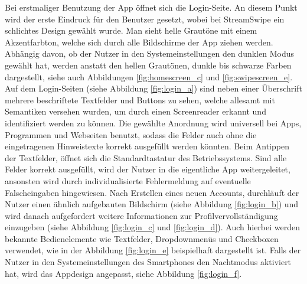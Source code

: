 Bei erstmaliger Benutzung der App öffnet sich die Login-Seite. An diesem Punkt wird der erste Eindruck für den Benutzer gesetzt, wobei bei StreamSwipe ein schlichtes Design gewählt wurde. Man sieht helle Grautöne mit einem Akzentfarbton, welche sich durch alle Bildschirme der App ziehen werden. Abhängig davon, ob der Nutzer in den Systemeinstellungen den dunklen Modus gewählt hat, werden anstatt den hellen Grautönen, dunkle bis schwarze Farben dargestellt, siehe auch Abbildungen \ref{fig:homescreen_c} und \ref{fig:swipescreen_e}.\\
Auf dem Login-Seiten (siehe Abbildung \ref{fig:login_a}) sind neben einer Überschrift mehrere beschriftete Textfelder und Buttons zu sehen, welche allesamt mit Semantiken versehen wurden, um durch einen Screenreader erkannt und identifiziert werden zu können. Die gewählte Anordnung wird universell bei Apps, Programmen und Webseiten benutzt, sodass die Felder auch ohne die eingetragenen Hinweistexte korrekt ausgefüllt werden könnten. Beim Antippen der Textfelder, öffnet sich die Standardtastatur des Betriebssystems. Sind alle Felder korrekt ausgefüllt, wird der Nutzer in die eigentliche App weitergeleitet, ansonsten wird durch individualisierte Fehlermeldung auf eventuelle Falscheingaben hingewiesen. Nach Erstellen eines neuen Accounts, durchläuft der Nutzer einen ähnlich aufgebauten Bildschirm (siehe Abbildung \ref{fig:login_b}) und wird danach aufgefordert weitere Informationen zur Profilvervollständigung einzugeben (siehe Abbildung \ref{fig:login_c} und \ref{fig:login_d}). Auch hierbei werden bekannte Bedienelemente wie Textfelder, Dropdownmenüs und Checkboxen verwendet, wie in der Abbildung \ref{fig:login_e} beispielhaft dargestellt ist. Falls der Nutzer in den Systemeinstellungen des Smartphones den Nachtmodus aktiviert hat, wird das Appdesign angepasst, siehe Abbildung \ref{fig:login_f}.


